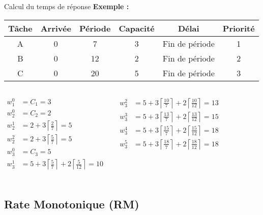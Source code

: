 \begin{frame}{Calcul du temps de réponse}
  \textbf{Exemple :}
  \begin{center}
    \begin{tabular}{cccccc}
      \hline
      Tâche & Arrivée & Période & Capacité & Délai & Priorité \\
      \hline
      A & 0 &  7 & 3 & Fin de période & 1\\
      B & 0 & 12 & 2 & Fin de période & 2\\
      C & 0 & 20 & 5 & Fin de période & 3\\
      \hline
    \end{tabular}
  \end{center}
  \pause  
  \begin{columns}
    \begin{align*}
      w_1^0 &= C_1 = 3\\
      w_2^0 &= C_2 = 2\\
      w_2^1 &= 2 + 3 \left\lceil\frac{2}{7}\right\rceil = 5\\
      w_2^2 &= 2 + 3 \left\lceil\frac{5}{7}\right\rceil = 5\\
      w_3^0 &= C_3 = 5\\
      w_3^1 &= 5 + 3 \left\lceil\frac{5}{7}\right\rceil + 2 \left\lceil\frac{5}{12}\right\rceil = 10\\
    \end{align*} 
    
    \begin{align*}
      w_3^2 &= 5 + 3 \left\lceil\frac{10}{7}\right\rceil + 2 \left\lceil\frac{10}{12}\right\rceil = 13\\
      w_3^3 &= 5 + 3 \left\lceil\frac{13}{7}\right\rceil + 2 \left\lceil\frac{13}{12}\right\rceil = 15\\
      w_3^4 &= 5 + 3 \left\lceil\frac{15}{7}\right\rceil + 2 \left\lceil\frac{15}{12}\right\rceil = 18\\
      w_3^5 &= 5 + 3 \left\lceil\frac{18}{7}\right\rceil + 2 \left\lceil\frac{18}{12}\right\rceil = 18\\
    \end{align*} 
  \end{columns}
\end{frame}

\subsection{Rate Monotonique (RM)}

